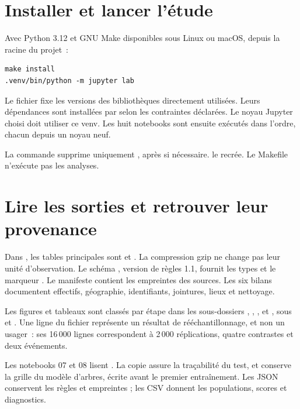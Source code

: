 \section{Installer et lancer l'étude}
Avec Python 3.12 et GNU Make disponibles sous Linux ou macOS, depuis la racine du projet~:
\begin{verbatim}
make install
.venv/bin/python -m jupyter lab
\end{verbatim}
Le fichier  fixe les versions des bibliothèques directement
utilisées. Leurs dépendances sont installées par  selon les contraintes
 déclarées. Le noyau Jupyter choisi doit utiliser ce venv. Les huit notebooks sont
 ensuite exécutés dans l'ordre, chacun depuis un noyau neuf.

La commande  supprime uniquement , après 
si nécessaire.  le recrée. Le Makefile n'exécute pas les analyses.

\section{Lire les sorties et retrouver leur provenance}
Dans , les tables principales sont
 et
. La compression gzip ne change
pas leur unité d'observation. Le schéma , version
 de règles 1.1, fournit les types et le marqueur .
Le manifeste  contient les empreintes des sources.
Les six bilans documentent effectifs, géographie, identifiants, jointures, lieux et nettoyage.

Les figures et tableaux sont classés par étape dans les sous-dossiers
, , , 
et , sous  et . Une ligne du fichier
 représente un résultat de rééchantillonnage,
et non un usager~: ses 16\,000 lignes correspondent à 2\,000 réplications, quatre
contrastes et deux événements.

Les notebooks 07 et 08 lisent .
La copie  assure la traçabilité du test, et
 conserve la grille du modèle d'arbres, écrite avant
le premier entraînement.
Les JSON conservent les règles et empreintes ; les CSV donnent les populations,
scores et diagnostics.

